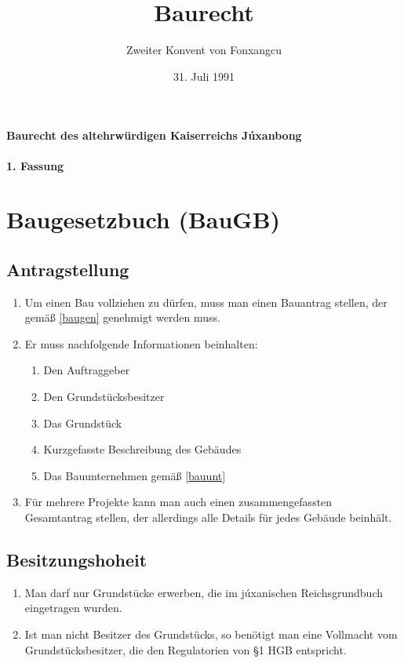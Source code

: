 \documentclass{article}
\title{Baurecht}
\author{Zweiter Konvent von Fonxangcu}
\date{31. Juli 1991}
\begin{document}
\maketitle
\vspace*{\fill}
\paragraph{Baurecht des altehrwürdigen Kaiserreichs Júxanbong}

\newpage
{}
\vspace*{\fill}
\begin{Center}
\textbf{1. Fassung}
\vspace*{\fill}
\end{Center}
\newpage
\tableofcontents
\newpage
\section{Baugesetzbuch (BauGB)}
\localtableofcontents

\subsection{Antragstellung}
\begin{enumerate}[(1)]
    \item Um einen Bau vollziehen zu dürfen, muss man einen Bauantrag stellen, der gemäß \ref{baugen} genehmigt werden muss.
    \item Er muss nachfolgende Informationen beinhalten:
    \begin{enumerate}[1.]
        \item Den Auftraggeber
        \item Den Grundstücksbesitzer
        \item Das Grundstück
        \item Kurzgefasste Beschreibung des Gebäudes
        \item Das Bauunternehmen gemäß \ref{bauunt}
    \end{enumerate}
    \item Für mehrere Projekte kann man auch einen zusammengefassten Gesamtantrag stellen, der allerdings alle Details für jedes Gebäude beinhält.
\end{enumerate}

\subsection{Besitzungshoheit}
\begin{enumerate}[(1)]
    \item Man darf nur Grundstücke erwerben, die im júxanischen Reichsgrundbuch eingetragen wurden.
    \item Ist man nicht Besitzer des Grundstücks, so benötigt man eine Vollmacht vom Grundstücksbesitzer, die den Regulatorien von §1 HGB entspricht.
\end{enumerate}
\end{document}
